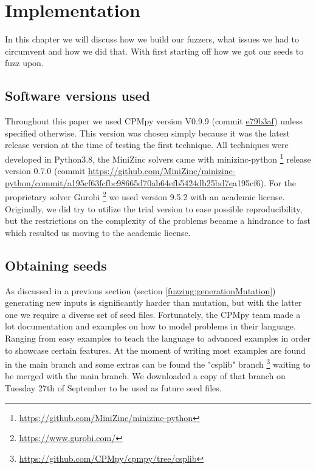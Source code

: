\chapter{Implementation}
\label{cha:impl}
\label{impl:Intro}
In this chapter we will discuss how we build our fuzzers, what issues we had to circumvent and how we did that. With first starting off how we got our seeds to fuzz upon.

\section{Software versions used}
Throughout this paper we used CPMpy version V0.9.9 (commit \href{https://github.com/CPMpy/cpmpy/commit/e79b3afedc934a9437c2ddb3a9f54d7e2d7bd3ee}{e79b3af}) unless specified otherwise. This version was chosen simply because it was the latest release version at the time of testing the first technique. All techniques were developed in Python3.8, the MiniZinc solvers came with minizinc-python \footnote{\url{https://github.com/MiniZinc/minizinc-python}} release version 0.7.0 (commit \url{https://github.com/MiniZinc/minizinc-python/commit/a195cf63fcfbc98665d70ab64efb5424db25bd7e}{a195cf6}). For the proprietary solver Gurobi \footnote{\url{https://www.gurobi.com/}} we used version 9.5.2 with an academic license. 
Originally, we did try to utilize the trial version to ease possible reproducibility, but the restrictions on the complexity of the problems became a hindrance to fast which resulted us moving to the academic license.



\section{Obtaining seeds}
\label{impl:obtainingSeeds}
As discussed in a previous section (section \ref{fuzzing:generationMutation}) generating new inputs is significantly harder than mutation, but with the latter one we require a diverse set of seed files. Fortunately, the CPMpy team made a lot documentation and examples on how to model problems in their language. Ranging from easy examples to teach the language to advanced examples in order to showcase certain features. 
At the moment of writing most examples are found in the main branch and some extras can be found the "csplib" branch \footnote{\url{https://github.com/CPMpy/cpmpy/tree/csplib}} waiting to be merged with the main branch. We downloaded a copy of that branch on Tuesday 27th of September to be used as future seed files. 

